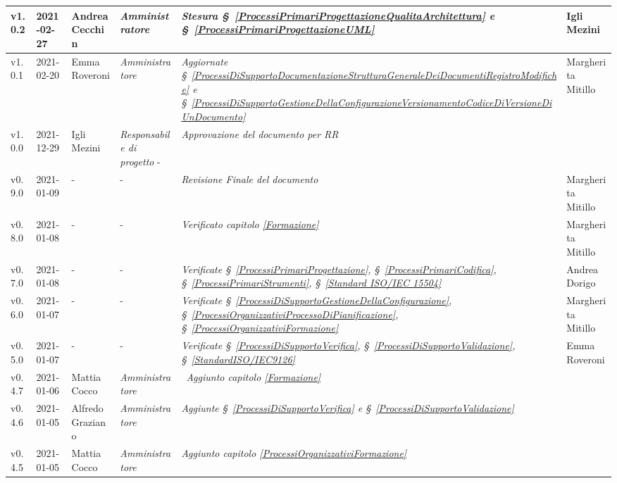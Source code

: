 {\begin{center}
\begin{longtable}[c]{|p{2cm-1\tabcolsep}|p{2cm}|p{3cm-2\tabcolsep}|p{3cm-1.5\tabcolsep}|p{}|p{3cm-2\tabcolsep}|}
		\hline
		\centering v1.0.2 & 2021-02-27 & Andrea Cecchin & \centering \textit{Amministratore}  & \textit{Stesura  \S~\ref{ProcessiPrimariProgettazioneQualitaArchitettura} e \S~\ref{ProcessiPrimariProgettazioneUML}} & Igli Mezini \\
		\hline
		\centering v1.0.1 & 2021-02-20 & Emma Roveroni & \centering \textit{Amministratore}  & \textit{Aggiornate  \S~\ref{ProcessiDiSupportoDocumentazioneStrutturaGeneraleDeiDocumentiRegistroModifiche} e \S~\ref{ProcessiDiSupportoGestioneDellaConfigurazioneVersionamentoCodiceDiVersioneDiUnDocumento}} & Margherita Mitillo \\
		\hline
		\centering v1.0.0 & 2021-12-29 & Igli Mezini & \centering \textit{Responsabile di progetto}  - & \textit{Approvazione del documento per RR} & \makecell[c]{-} \\
		\hline
		\centering v0.9.0 & 2021-01-09 & \centering - & \centering -  & \textit{Revisione Finale del documento} & Margherita Mitillo\\
		\hline
		\centering v0.8.0 & 2021-01-08 & \centering - & \centering -  & \textit{Verificato capitolo \ref{Formazione}} & Margherita Mitillo \\
		\hline
		\centering v0.7.0 & 2021-01-08 & \centering - & \centering -  & \textit{Verificate  \S~\ref{ProcessiPrimariProgettazione}, \S~\ref{ProcessiPrimariCodifica}, \S~\ref{ProcessiPrimariStrumenti}, \S~\ref{Standard ISO/IEC 15504} } & Andrea Dorigo \\
		\hline
		\centering v0.6.0 & 2021-01-07 & \centering - & \centering -  & \textit{Verificate  \S~\ref{ProcessiDiSupportoGestioneDellaConfigurazione}, \S~\ref{ProcessiOrganizzativiProcessoDiPianificazione}, \S~\ref{ProcessiOrganizzativiFormazione}} & Margherita Mitillo \\
		\hline
		\centering v0.5.0 & 2021-01-07 & \centering - & \centering -  & \textit{Verificate \S~\ref{ProcessiDiSupportoVerifica}, \S~\ref{ProcessiDiSupportoValidazione}, \S~\ref{StandardISO/IEC9126}} & Emma Roveroni \\
		\hline
		\centering v0.4.7 & 2021-01-06 & Mattia Cocco & \centering \textit{Amministratore}  & \	\textit{Aggiunto capitolo \ref{Formazione}} & \makecell[c]{-} \\
		\hline
		\centering v0.4.6 & 2021-01-05 & Alfredo Graziano & \centering \textit{Amministratore} &  \textit{Aggiunte  \S~\ref{ProcessiDiSupportoVerifica} e \S~\ref{ProcessiDiSupportoValidazione} } & \makecell[c]{-} \\
		\hline
		\centering v0.4.5 & 2021-01-05 & Mattia Cocco & \centering \textit{Amministratore}  & \textit{Aggiunto capitolo \ref{ProcessiOrganizzativiFormazione}}  & \makecell[c]{-}\\

\end{longtable}
\end{center}}
